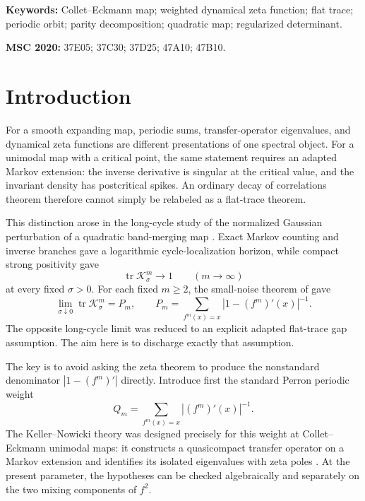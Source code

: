 \documentclass[11pt]{article}
\theoremstyle{definition}
\theoremstyle{remark}
\newcommand{\tr}{\operatorname{tr}}
\newcommand{\cK}{\mathcal K}
\begin{document}
\noindent\textbf{Keywords:} Collet--Eckmann map; weighted dynamical zeta
function; flat trace; periodic orbit; parity decomposition; quadratic map;
regularized determinant.

\medskip
\noindent\textbf{MSC 2020:} 37E05; 37C30; 37D25; 47A10; 47B10.

\section{Introduction}

For a smooth expanding map, periodic sums, transfer-operator eigenvalues, and
dynamical zeta functions are different presentations of one spectral object.
For a unimodal map with a critical point, the same statement requires an
adapted Markov extension: the inverse derivative is singular at the critical
value, and the invariant density has postcritical spikes.  An ordinary decay
of correlations theorem therefore cannot simply be relabeled as a flat-trace
theorem.

This distinction arose in the long-cycle study of the normalized Gaussian
perturbation of a quadratic band-merging map
\citep{WangLongCycle2026}.  Exact Markov counting and inverse branches gave a
logarithmic cycle-localization horizon, while compact strong positivity gave
\begin{equation}\label{eq:noisy-long-limit-intro}
 \tr\cK_\sigma^m\longrightarrow1
 \qquad(m\to\infty)
\end{equation}
at every fixed $\sigma>0$.  For each fixed $m\ge2$, the small-noise theorem of
\citet{WangSmallNoise2026} gave
\begin{equation}\label{eq:fixed-length-intro}
 \lim_{\sigma\downarrow0}\tr\cK_\sigma^m=P_m,
 \qquad
 P_m=\sum_{f^m(x)=x}|1-(f^m)'(x)|^{-1}.
\end{equation}
The opposite long-cycle limit was reduced to an explicit adapted flat-trace
gap assumption.  The aim here is to discharge exactly that assumption.

The key is to avoid asking the zeta theorem to produce the nonstandard
denominator $|1-(f^m)'|$ directly.  Introduce first the standard Perron
periodic weight
\begin{equation}\label{eq:Q-intro}
 Q_m=\sum_{f^m(x)=x}|(f^m)'(x)|^{-1}.
\end{equation}
The Keller--Nowicki theory was designed precisely for this weight at
Collet--Eckmann unimodal maps: it constructs a quasicompact transfer operator
on a Markov extension and identifies its isolated eigenvalues with zeta poles
\citep{KellerNowicki1992}.  At the present parameter, the hypotheses can be
checked algebraically and separately on the two mixing components of $f^2$.
\end{document}
